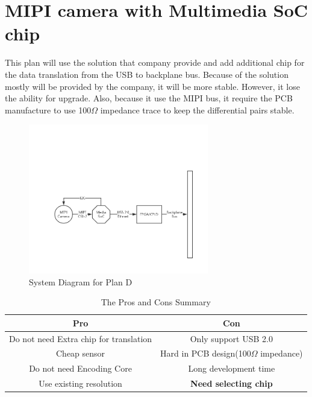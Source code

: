 \documentclass[12pt,article]{memoir}
\begin{document}
\section{MIPI camera with Multimedia SoC chip}
This plan will use the solution that company provide and add additional chip for the data translation from the USB to backplane bus. Because of the solution mostly will be provided by the company, it will be more stable. However, it lose the ability for upgrade. Also, because it use the MIPI bus, it require the PCB manufacture to use 100$\Omega$ impedance trace to keep the differential pairs stable.
\begin{figure}[htp]
\begin{center}
\includegraphics[width=0.7\textwidth]{img/DR00002_Plan4.png}
 \caption{System Diagram for Plan D}	
\end{center}
\end{figure}
\begin{table}[H]
	\centering
		\begin{tabu}{c | c }
		Pro & Con \\ \hline
		Do not need Extra chip for translation & Only support USB 2.0\\
		Cheap sensor & Hard in PCB design(100$\Omega$ impedance) \\
		Do not need Encoding Core & Long development time \\
		Use existing resolution  & \textbf{Need selecting chip} \\
		\end{tabu}
	\caption{The Pros and Cons Summary}
\end{table}
\newpage
\end{document}
